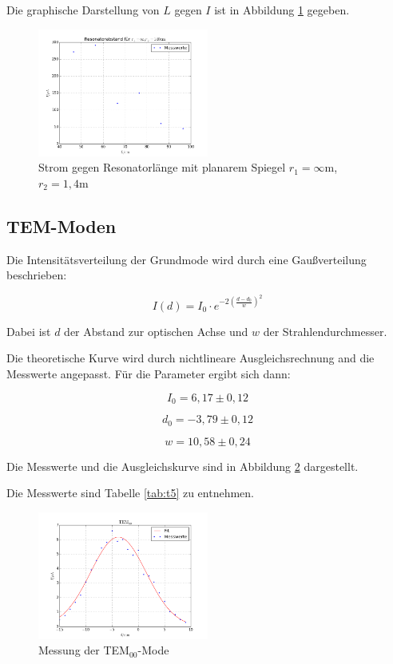 \noindent Die graphische Darstellung von \(L\) gegen \(I\) ist in Abbildung \ref{fig:stabil2} gegeben.

\begin{figure}
	\centering
		\includegraphics[width=0.5\textwidth]{plots/stabil2}
	\caption{Strom gegen Resonatorlänge mit planarem Spiegel \(r_1=\infty\)m, \(r_2=1,4\)m}
	\label{fig:stabil2}
\end{figure}

\subsection{TEM-Moden}
Die Intensitätsverteilung der Grundmode wird durch eine Gaußverteilung beschrieben:

\begin{equation}
I(d)=I_0\cdot e^{-2\left(\frac{d-d_0}{w}\right)^2}
\end{equation}

\noindent Dabei ist \(d\) der Abstand zur optischen Achse und \(w\) der Strahlendurchmesser.

\noindent Die theoretische Kurve wird durch nichtlineare Ausgleichsrechnung and die Messwerte angepasst. Für die Parameter ergibt sich dann:


\begin{equation*}
I_0=6,17\pm0,12
\end{equation*}

\begin{equation*}
d_0=-3,79\pm0,12
\end{equation*}

\begin{equation*}
w=10,58\pm0,24
\end{equation*}

\noindent Die Messwerte und die Ausgleichskurve sind in Abbildung \ref{fig:TEM00} dargestellt.

\noindent Die Messwerte sind Tabelle \ref{tab:t5} zu entnehmen.

\begin{figure}
	\centering
	\includegraphics[width=0.5\textwidth]{plots/TEM00}
	\caption{Messung der TEM\(_{00}\)-Mode}
	\label{fig:TEM00}
\end{figure}


